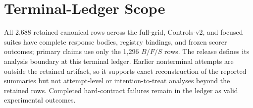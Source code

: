 \section{Terminal-Ledger Scope}
\label{app:terminal-ledger}

All 2,688 retained canonical rows across the full-grid, Controls-v2, and focused suites have complete response bodies, registry bindings, and frozen scorer outcomes; primary claims use only the 1,296 $B/F/S$ rows. The release defines its analysis boundary at this terminal ledger. Earlier nonterminal attempts are outside the retained artifact, so it supports exact reconstruction of the reported summaries but not attempt-level or intention-to-treat analyses beyond the retained rows. Completed hard-contract failures remain in the ledger as valid experimental outcomes.
